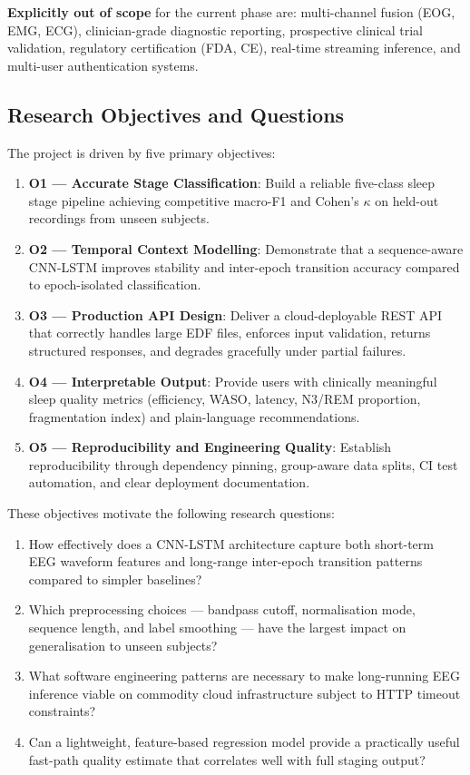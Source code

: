 \documentclass[10pt]{article}
\begin{document}
\textbf{Explicitly out of scope} for the current phase are: multi-channel fusion (EOG, EMG, ECG), clinician-grade diagnostic reporting, prospective clinical trial validation, regulatory certification (FDA, CE), real-time streaming inference, and multi-user authentication systems.

\subsection{Research Objectives and Questions}
\label{sec:objectives}

The project is driven by five primary objectives:

\begin{enumerate}
  \item \textbf{O1 --- Accurate Stage Classification}: Build a reliable five-class sleep stage pipeline achieving competitive macro-F1 and Cohen's $\kappa$ on held-out recordings from unseen subjects.
  \item \textbf{O2 --- Temporal Context Modelling}: Demonstrate that a sequence-aware CNN-LSTM improves stability and inter-epoch transition accuracy compared to epoch-isolated classification.
  \item \textbf{O3 --- Production API Design}: Deliver a cloud-deployable REST API that correctly handles large EDF files, enforces input validation, returns structured responses, and degrades gracefully under partial failures.
  \item \textbf{O4 --- Interpretable Output}: Provide users with clinically meaningful sleep quality metrics (efficiency, WASO, latency, N3/REM proportion, fragmentation index) and plain-language recommendations.
  \item \textbf{O5 --- Reproducibility and Engineering Quality}: Establish reproducibility through dependency pinning, group-aware data splits, CI test automation, and clear deployment documentation.
\end{enumerate}

These objectives motivate the following research questions:
\begin{enumerate}
  \item[\textbf{RQ1}] How effectively does a CNN-LSTM architecture capture both short-term EEG waveform features and long-range inter-epoch transition patterns compared to simpler baselines?
  \item[\textbf{RQ2}] Which preprocessing choices --- bandpass cutoff, normalisation mode, sequence length, and label smoothing --- have the largest impact on generalisation to unseen subjects?
  \item[\textbf{RQ3}] What software engineering patterns are necessary to make long-running EEG inference viable on commodity cloud infrastructure subject to HTTP timeout constraints?
  \item[\textbf{RQ4}] Can a lightweight, feature-based regression model provide a practically useful fast-path quality estimate that correlates well with full staging output?
\end{enumerate}
\end{document}
